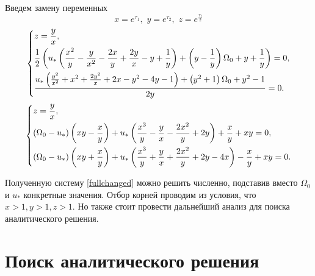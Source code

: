 \documentclass[a4paper,12pt, openany]{book}
\theoremstyle{plain} %
\theoremstyle{definition} %
\theoremstyle{remark} %
\numberwithin{equation}{chapter}
\begin{document}
{Введем замену переменных
\[
    x=e^{\tau_1} ,\,\,y=e^{\tau_2} ,\,\,z=e^{\frac{\tau_f}{2}}
\]
\[
    \left\{ {\begin{aligned}
                 & z=\frac{y}{x}, \hfill                                                         \\
                 & \frac{1}{2} \left(u_* \left(\frac{x^2}{y}-\frac{y}{x^2}-\frac{2 x}{y}+\frac{2
                        y}{x}-y+\frac{1}{y}\right)+\left(y-\frac{1}{y}\right) \Omega
                _0+y+\frac{1}{y}\right)=0, \hfill                                                \\
                 & \frac{u_* \left(\frac{y^2}{x^2}+x^2+\frac{2 y^2}{x}+2 x-y^2-4
                y-1\right)+\left(y^2+1\right) \Omega _0+y^2-1}{2 y}=0. \hfill                    \\
            \end{aligned}} \right.
\]
\begin{equation}\label{fullchanged}
    \left\{ {\begin{aligned}
                 & z=\frac{y}{x}, \hfill                                                                                                              \\
                 & (\Omega_0-u_*)\left( xy-\frac{x}{y}\right)+u_*\left(\frac{x^3}{y}-\frac{y}{x}-\frac{2x^2}{y}+2y\right)+\frac{x}{y}+xy=0, \hfill    \\
                 & (\Omega_0-u_*)\left( xy+\frac{x}{y}\right)+u_*\left(\frac{x^3}{y}+\frac{y}{x}+\frac{2x^2}{y}+2y-4x\right)-\frac{x}{y}+xy=0. \hfill \\
            \end{aligned}} \right.
\end{equation}

Полученную систему \eqref{fullchanged} можно решить численно, подставив вместо $\Omega_0$ и $u_\ast$ конкретные значения.
Отбор корней проводим из условия, что $x>1,y>1,z>1$. 
Но также стоит провести дальнейший анализ для поиска аналитического решения.
\section{Поиск аналитического решения}

}
\end{document}
